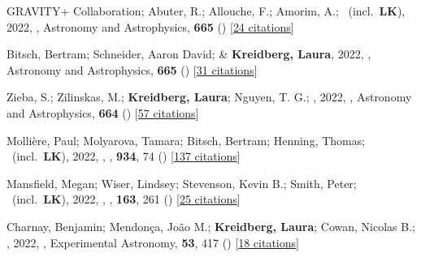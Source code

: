 \item[{\color{numcolor}\scriptsize69}] GRAVITY+ Collaboration; Abuter, R.; Allouche, F.; Amorim, A.; \etal\ (incl.\ \textbf{LK}), 2022, , Astronomy and Astrophysics, \textbf{665} () [\href{https://ui.adsabs.harvard.edu/abs/2022A&A...665A..75G}{24 citations}]

\item[{\color{numcolor}\scriptsize68}] Bitsch, Bertram; Schneider, Aaron David; \& \textbf{Kreidberg, Laura}, 2022, , Astronomy and Astrophysics, \textbf{665} () [\href{https://ui.adsabs.harvard.edu/abs/2022A&A...665A.138B}{31 citations}]

\item[{\color{numcolor}\scriptsize67}] Zieba, S.; Zilinskas, M.; \textbf{Kreidberg, Laura}; Nguyen, T. G.; \etal, 2022, , Astronomy and Astrophysics, \textbf{664} () [\href{https://ui.adsabs.harvard.edu/abs/2022A&A...664A..79Z}{57 citations}]

\item[{\color{numcolor}\scriptsize66}] Molli{\`e}re, Paul; Molyarova, Tamara; Bitsch, Bertram; Henning, Thomas; \etal\ (incl.\ \textbf{LK}), 2022, , \apj, \textbf{934}, 74 () [\href{https://ui.adsabs.harvard.edu/abs/2022ApJ...934...74M}{137 citations}]

\item[{\color{numcolor}\scriptsize65}] Mansfield, Megan; Wiser, Lindsey; Stevenson, Kevin B.; Smith, Peter; \etal\ (incl.\ \textbf{LK}), 2022, , \aj, \textbf{163}, 261 () [\href{https://ui.adsabs.harvard.edu/abs/2022AJ....163..261M}{25 citations}]

\item[{\color{numcolor}\scriptsize64}] Charnay, Benjamin; Mendon{\c{c}}a, Jo{\~a}o M.; \textbf{Kreidberg, Laura}; Cowan, Nicolas B.; \etal, 2022, , Experimental Astronomy, \textbf{53}, 417 () [\href{https://ui.adsabs.harvard.edu/abs/2022ExA....53..417C}{18 citations}]

